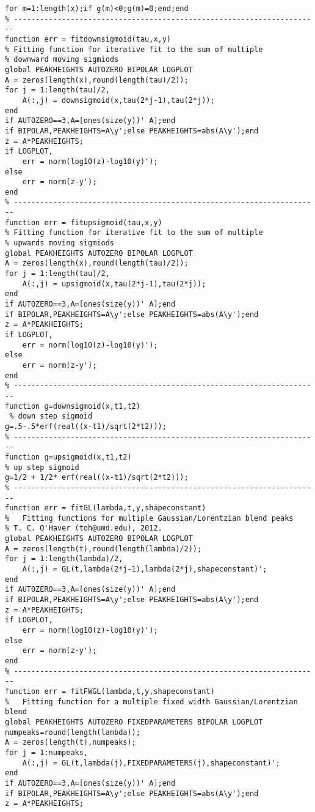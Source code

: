 \begin{lstlisting}
for m=1:length(x);if g(m)<0;g(m)=0;end;end
% ----------------------------------------------------------------------
function err = fitdownsigmoid(tau,x,y)
% Fitting function for iterative fit to the sum of multiple
% downward moving sigmiods 
global PEAKHEIGHTS AUTOZERO BIPOLAR LOGPLOT
A = zeros(length(x),round(length(tau)/2));
for j = 1:length(tau)/2,
    A(:,j) = downsigmoid(x,tau(2*j-1),tau(2*j));
end
if AUTOZERO==3,A=[ones(size(y))' A];end
if BIPOLAR,PEAKHEIGHTS=A\y';else PEAKHEIGHTS=abs(A\y');end
z = A*PEAKHEIGHTS;
if LOGPLOT,
    err = norm(log10(z)-log10(y)');
else
    err = norm(z-y');
end
% ----------------------------------------------------------------------
function err = fitupsigmoid(tau,x,y)
% Fitting function for iterative fit to the sum of multiple
% upwards moving sigmiods
global PEAKHEIGHTS AUTOZERO BIPOLAR LOGPLOT
A = zeros(length(x),round(length(tau)/2));
for j = 1:length(tau)/2,
    A(:,j) = upsigmoid(x,tau(2*j-1),tau(2*j));
end
if AUTOZERO==3,A=[ones(size(y))' A];end
if BIPOLAR,PEAKHEIGHTS=A\y';else PEAKHEIGHTS=abs(A\y');end
z = A*PEAKHEIGHTS;
if LOGPLOT,
    err = norm(log10(z)-log10(y)');
else
    err = norm(z-y');
end
% ----------------------------------------------------------------------
function g=downsigmoid(x,t1,t2)
 % down step sigmoid
g=.5-.5*erf(real((x-t1)/sqrt(2*t2)));
% ----------------------------------------------------------------------
function g=upsigmoid(x,t1,t2)
% up step sigmoid
g=1/2 + 1/2* erf(real((x-t1)/sqrt(2*t2))); 
% ----------------------------------------------------------------------
function err = fitGL(lambda,t,y,shapeconstant)
%   Fitting functions for multiple Gaussian/Lorentzian blend peaks
% T. C. O'Haver (toh@umd.edu), 2012.
global PEAKHEIGHTS AUTOZERO BIPOLAR LOGPLOT
A = zeros(length(t),round(length(lambda)/2));
for j = 1:length(lambda)/2,
    A(:,j) = GL(t,lambda(2*j-1),lambda(2*j),shapeconstant)';
end
if AUTOZERO==3,A=[ones(size(y))' A];end
if BIPOLAR,PEAKHEIGHTS=A\y';else PEAKHEIGHTS=abs(A\y');end
z = A*PEAKHEIGHTS;
if LOGPLOT,
    err = norm(log10(z)-log10(y)');
else
    err = norm(z-y');
end
% ----------------------------------------------------------------------
function err = fitFWGL(lambda,t,y,shapeconstant)
%	Fitting function for a multiple fixed width Gaussian/Lorentzian blend
global PEAKHEIGHTS AUTOZERO FIXEDPARAMETERS BIPOLAR LOGPLOT
numpeaks=round(length(lambda));
A = zeros(length(t),numpeaks);
for j = 1:numpeaks,
    A(:,j) = GL(t,lambda(j),FIXEDPARAMETERS(j),shapeconstant)';
end
if AUTOZERO==3,A=[ones(size(y))' A];end
if BIPOLAR,PEAKHEIGHTS=A\y';else PEAKHEIGHTS=abs(A\y');end
z = A*PEAKHEIGHTS;

\end{lstlisting}
